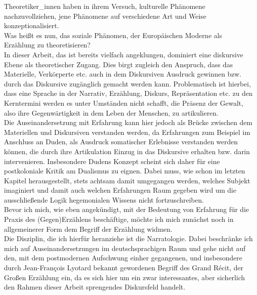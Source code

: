 Theoretiker\_innen haben in ihrem Versuch, kulturelle Phänomene
nachzuvollziehen, jene Phänomene auf verschiedene Art und Weise
konzeptionalisiert.\\
 Was heißt es nun, das soziale Phänomen, der Europäischen
Moderne als Erzählung zu theoretisieren?\\

In dieser Arbeit, das ist bereits vielfach angeklungen, dominiert eine
diskursive Ebene als theoretischer Zugang. Dies birgt zugleich den Anspruch,
dass das Materielle, Verkörperte etc. auch in dem Diskursiven Ausdruck gewinnen
bzw. durch das Diskursive zugänglich gemacht werden kann. Problematisch ist
hierbei, dass eine Sprache in der Narrativ, Erzählung, Diskurs, Repräsentation
etc. zu den Kerntermini werden es unter Umständen nicht schafft, die Präsenz
der Gewalt, also ihre Gegenwärtigkeit in dem Leben der Menschen, zu
artikulieren.\\

Die Auseinandersetzung mit Erfahrung kann hier jedoch als Brücke zwischen dem
Materiellen und Diskursiven verstanden werden, da Erfahrungen zum Beispiel im
Anschluss an Duden\footnotemark {}, als Ausdruck somatischer Erlebnisse verstanden werden
können, die durch ihre Artikulation Einzug in das Diskursive erhalten bzw.
darin intervenieren. Insbesondere Dudens Konzept scheint sich daher für eine
postkoloniale Kritik am Dualismus zu eignen. Dabei muss, wie schon im letzten
Kapitel herausgestellt, stets achtsam damit umgegangen werden, welches Subjekt
imaginiert und damit auch welchen Erfahrungen Raum gegeben wird um die
ausschließende Logik hegemonialen Wissens nicht fortzuschreiben. 
\\

Bevor ich mich, wie eben angekündigt, mit der Bedeutung von Erfahrung für die
Praxis des (Gegen)Erzählens beschäftige, möchte ich mich zunächst noch in
allgemeinerer Form dem Begriff der Erzählung widmen.\\
Die Disziplin, die ich hierfür heranziehe ist die Narratologie. Dabei
beschränke ich mich auf Auseinandersetzungen im deutschsprachigen Raum und gehe
nicht auf den, mit dem postmodernen Aufschwung einher gegangenen, und
insbesondere durch Jean-François Lyotard bekannt gewordenen Begriff des Grand
Récit, der Großen Erzählung ein, da es sich hier um ein zwar interessantes,
aber sicherlich den Rahmen dieser Arbeit sprengendes Diskursfeld handelt.
\\

